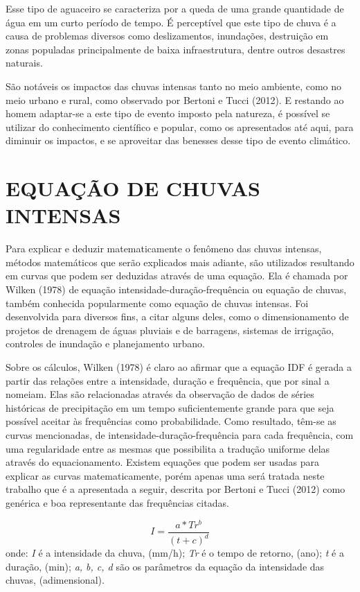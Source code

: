 Esse tipo de aguaceiro se caracteriza por a queda de uma grande quantidade de água em um curto período de tempo. É perceptível que este tipo de chuva é a causa de problemas diversos como deslizamentos, inundações, destruição em zonas populadas principalmente de baixa infraestrutura, dentre outros desastres naturais.

São notáveis os impactos das chuvas intensas tanto no meio ambiente, como no meio urbano e rural, como observado por Bertoni e Tucci (2012). E restando ao homem adaptar-se a este tipo de evento imposto pela natureza, é possível se utilizar do conhecimento científico e popular, como os apresentados até aqui, para diminuir os impactos, e se aproveitar das benesses desse tipo de evento climático.

\section{EQUAÇÃO DE CHUVAS INTENSAS}

Para explicar e deduzir matematicamente o fenômeno das chuvas intensas, métodos matemáticos que serão explicados mais adiante, são utilizados resultando em curvas que podem ser deduzidas através de uma equação. Ela é chamada por Wilken (1978) de equação intensidade-duração-frequência ou equação de chuvas, também conhecida popularmente como equação de chuvas intensas. Foi desenvolvida para diversos fins, a citar alguns deles, como o dimensionamento de projetos de drenagem de águas pluviais e de barragens, sistemas de irrigação, controles de inundação e planejamento urbano. 

Sobre os cálculos, Wilken (1978) é claro ao afirmar que a equação IDF é gerada a partir das relações entre a intensidade, duração e frequência, que por sinal a nomeiam. Elas são relacionadas através da observação de dados de séries históricas de precipitação em um tempo suficientemente grande para que seja possível aceitar às frequências como probabilidade.  Como resultado, têm-se as curvas mencionadas, de intensidade-duração-frequência para cada frequência, com uma regularidade entre as mesmas que possibilita a tradução uniforme delas através do equacionamento. Existem equações que podem ser usadas para explicar as curvas matematicamente, porém apenas uma será tratada neste trabalho que é a apresentada a seguir, descrita por Bertoni e Tucci (2012) como genérica e boa representante das frequências citadas.\bigskip

\newpage

\begin{equation}
I = \frac{a * Tr^b}{(t + c)^d}
\end{equation}
\newline
onde:
\newline
\textit{I} é a intensidade da chuva, (mm/h);
\newline
\textit{Tr} é o tempo de retorno, (ano);
\newline
\textit{t} é a duração, (min);
\newline
\textit{a, b, c, d}  são os parâmetros da equação da intensidade das chuvas, (adimensional).\bigskip

